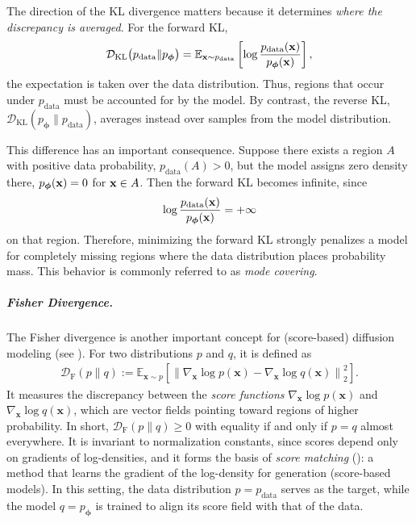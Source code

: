 The direction of the KL divergence matters because it determines
\emph{where the discrepancy is averaged}.
For the forward KL,
\[
\mathcal{D}_{\mathrm{KL}}
\big(p_{\mathrm{data}}\|p_{\bm{\phi}}\big)
=
\mathbb{E}_{{\mathbf{x}}\sim p_{\mathrm{data}}}
\left[
\log
\frac{p_{\mathrm{data}}({\mathbf{x}})}
     {p_{\bm{\phi}}({\mathbf{x}})}
\right],
\]
the expectation is taken over the data distribution.
Thus, regions that occur under $p_{\mathrm{data}}$ must be accounted for by
the model.
By contrast, the reverse KL,
$\mathcal{D}_{\mathrm{KL}}
(p_{\bm{\phi}}\|p_{\mathrm{data}})$,
averages instead over samples from the model distribution.

This difference has an important consequence.
Suppose there exists a region $A$ with positive data probability,
$p_{\mathrm{data}}(A)>0$, but the model assigns zero density there,
$p_{\bm{\phi}}({\mathbf{x}})=0$ for ${\mathbf{x}}\in A$.
Then the forward KL becomes infinite, since
\[
\log
\frac{p_{\mathrm{data}}({\mathbf{x}})}
     {p_{\bm{\phi}}({\mathbf{x}})}
=
+\infty
\]
on that region.
Therefore, minimizing the forward KL strongly penalizes a model for completely
missing regions where the data distribution places probability mass.
This behavior is commonly referred to as \emph{mode covering}.


\subparagraph{Fisher Divergence.} The Fisher divergence is another important concept for (score-based) diffusion modeling (see ). For two distributions $p$ and $q$, it is defined as
\begin{align}\label{eq:fisher}
    \mathcal D_{\mathrm F}(p \|  q)
:=
\mathbb{E}_{\mathbf{x}\sim p} \left[
\left\|\nabla_{\mathbf x}\log p(\mathbf x)-\nabla_{\mathbf x}\log q(\mathbf x)\right\|_2^{2}
\right].
\end{align}
It measures the discrepancy between the \emph{score functions} 
$\nabla_{\mathbf x}\log p(\mathbf x)$ and $\nabla_{\mathbf x}\log q(\mathbf x)$,
which are vector fields pointing toward regions of higher probability. 
In short, $\mathcal D_{\mathrm F}(p \|  q)\ge 0$ with equality if and only if $p=q$ almost everywhere. 
It is invariant to normalization constants, since scores depend only on gradients of log-densities, 
and it forms the basis of \emph{score matching} (): a method that learns the gradient of the log-density for generation (score-based models). 
In this setting, the data distribution $p=p_{\mathrm{data}}$ serves as the target, 
while the model $q=p_{\bm{\phi}}$ is trained to align its score field with that of the data.





